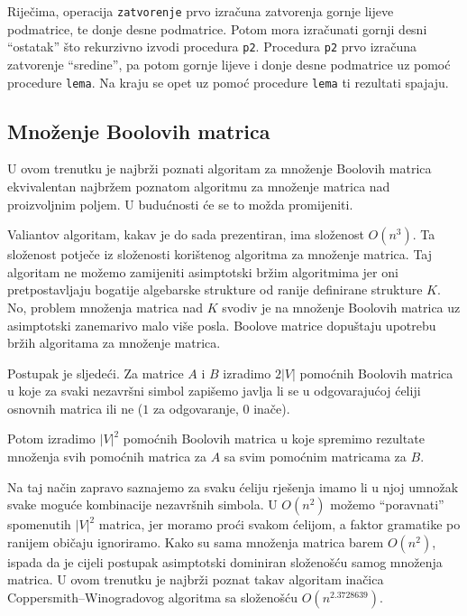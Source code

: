 \documentclass[a4paper,oneside,12pt]{article} %
\begin{document}
    Riječima, operacija \verb|zatvorenje| prvo izračuna 
        zatvorenja gornje lijeve podmatrice, te donje desne podmatrice.
    Potom mora izračunati gornji desni ``ostatak''
        što rekurzivno izvodi procedura \verb|p2|.
    Procedura \verb|p2| prvo izračuna zatvorenje ``sredine'',
        pa potom gornje lijeve i donje desne podmatrice uz pomoć procedure \verb|lema|. 
    Na kraju se opet uz pomoć procedure \verb|lema| ti rezultati spajaju.
       
    
    \subsection{Množenje Boolovih matrica}
    
    U ovom trenutku je najbrži poznati algoritam za množenje Boolovih matrica
        ekvivalentan najbržem poznatom algoritmu za množenje matrica nad proizvoljnim poljem.
    U budućnosti će se to možda promijeniti.
    
    Valiantov algoritam, kakav je do sada prezentiran, ima složenost $O(n^3)$.
    Ta složenost potječe iz složenosti korištenog algoritma za množenje matrica.
    Taj algoritam ne možemo zamijeniti asimptotski bržim algoritmima jer oni pretpostavljaju
        bogatije algebarske strukture od ranije definirane strukture $K$.
    No, problem množenja matrica nad $K$ svodiv je na množenje Boolovih matrica
        uz asimptotski zanemarivo malo više posla. 
    Boolove matrice dopuštaju upotrebu bržih algoritama za množenje matrica.
    
    Postupak je sljedeći. 
    Za matrice $A$ i $B$ izradimo $2|V|$ pomoćnih Boolovih matrica 
        u koje za svaki nezavršni simbol zapišemo javlja li se u odgovarajućoj ćeliji
        osnovnih matrica ili ne ($1$ za odgovaranje, $0$ inače).
       
    Potom izradimo $|V|^2$ pomoćnih Boolovih matrica u koje spremimo rezultate
        množenja svih pomoćnih matrica za $A$ sa svim pomoćnim matricama za $B$.
    
    Na taj način zapravo saznajemo za svaku ćeliju rješenja imamo 
        li u njoj umnožak svake moguće kombinacije nezavršnih simbola.
    U $O(n^2)$ možemo ``poravnati'' spomenutih $|V|^2$ matrica,
        jer moramo proći svakom ćelijom, a faktor gramatike po ranijem običaju ignoriramo.
    Kako su sama množenja matrica barem $O(n^2)$, 
        ispada da je cijeli postupak asimptotski dominiran složenošću samog množenja matrica.
    U ovom trenutku je najbrži poznat takav algoritam 
        inačica Coppersmith–Winogradovog algoritma sa složenošću $O(n^{2.3728639})$.
        
\end{document}
